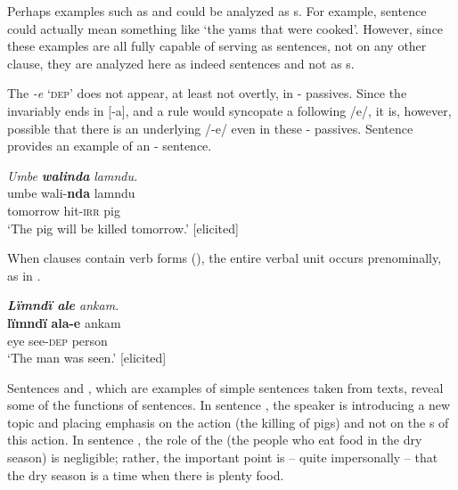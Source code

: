 Perhaps examples such as  and  could be analyzed as s. For example, sentence  could actually mean something like ‘the yams that were cooked’. However, since these examples are all fully capable of serving as  sentences, not  on any other clause, they are analyzed here as indeed  sentences and not as s.

The  \textit{{}-e} ‘\textsc{dep}’ does not appear, at least not overtly, in - passives. Since the   invariably ends in [-a], and a  rule would syncopate a following /e/, it is, however, possible that there is an underlying  /-e/ even in these - passives. Sentence  provides an example of an -  sentence.

\ea%
    \label{ex:syntax:278}
          \textit{Umbe} \textbf{\textit{walinda}} \textit{lamndu.}\\
\gll    umbe    wali-\textbf{nda}  lamndu\\
    tomorrow  hit-\textsc{irr}    pig\\
\glt `The pig will be killed tomorrow.’ [elicited]
\z

When  clauses contain  verb forms (), the entire verbal unit occurs prenominally, as in .

\ea%
    \label{ex:syntax:279}
          \textit{\textbf{Lïmndï ale} ankam.}\\
\gll    \textbf{lïmndï}  \textbf{ala-e}    ankam\\
    eye    see{}-\textsc{dep}  person\\
\glt `The man was seen.’ [elicited]
\z

Sentences  and , which are examples of simple  sentences taken from texts, reveal some of the  functions of  sentences. In sentence , the speaker is introducing a new topic and placing emphasis on the action (the killing of pigs) and not on the s of this action. In sentence , the role of the  (the people who eat food in the dry season) is negligible; rather, the important point is -- quite impersonally -- that the dry season is a time when there is plenty food.

